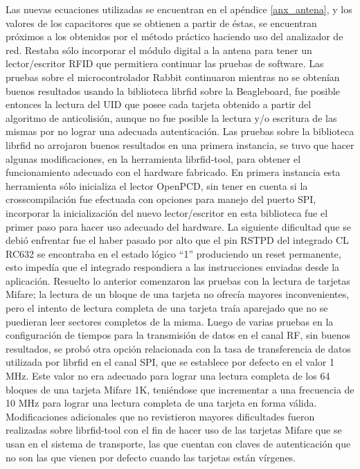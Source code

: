Las nuevas ecuaciones utilizadas se encuentran en el apéndice \ref{anx_antena}, y los valores de los capacitores que se obtienen a partir de éstas, se encuentran próximos a los obtenidos por el método práctico haciendo uso del analizador de red.
Restaba sólo incorporar el módulo digital a la antena para tener un lector/escritor RFID que permitiera continuar las pruebas de software.
Las pruebas sobre el microcontrolador Rabbit continuaron mientras no se obtenían buenos resultados usando la biblioteca librfid sobre la Beagleboard, fue posible entonces la lectura del UID que posee cada tarjeta obtenido a partir del algoritmo de anticolisión, aunque no fue posible la lectura y/o escritura de las mismas por no lograr una adecuada autenticación.
Las pruebas sobre la biblioteca librfid no arrojaron buenos resultados en una primera instancia, se tuvo que hacer algunas modificaciones, en la herramienta librfid-tool, para obtener el funcionamiento adecuado con el hardware fabricado. En primera instancia esta herramienta sólo inicializa el lector OpenPCD, sin tener en cuenta si la crosscompilación fue efectuada con opciones para manejo del puerto SPI, incorporar la inicialización del nuevo lector/escritor en esta biblioteca fue el primer paso para hacer uso adecuado del hardware. 
La siguiente dificultad que se debió enfrentar fue el haber pasado por alto que el pin RSTPD del integrado CL RC632 se encontraba en el estado lógico “1” produciendo un reset permanente, esto impedía que el integrado respondiera a las instrucciones enviadas desde la aplicación.
Resuelto lo anterior comenzaron las pruebas con la lectura de tarjetas Mifare; la lectura de un bloque de una tarjeta no ofrecía mayores inconvenientes, pero el intento de lectura completa de una tarjeta traía aparejado que no se puedieran leer sectores completos de la misma. Luego de varias pruebas en la configuración de tiempos para la transmisión de datos en el canal RF, sin buenos resultados, se probó otra opción relacionada con la tasa de transferencia de datos utilizada por librfid en el canal SPI, que se establece por defecto en el valor 1 MHz. Este valor no era adecuado para lograr una lectura completa de los 64 bloques de una tarjeta Mifare 1K, teniéndose que incrementar a una frecuencia de 10 MHz para lograr una lectura completa de una tarjeta en forma válida.
Modificaciones adicionales que no revistieron mayores dificultades fueron realizadas sobre librfid-tool con el fin de hacer uso de las tarjetas Mifare que se usan en el sistema de transporte, las que cuentan con claves de autenticación que no son las que vienen por defecto cuando las tarjetas están vírgenes. 